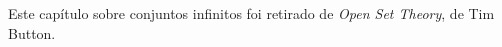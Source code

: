 \documentclass[../../../include/open-logic-chapter]{subfiles}
\begin{document}

\begin{editorial}
Este capítulo sobre conjuntos infinitos foi retirado de \emph{Open Set
Theory}, de Tim Button.
\end{editorial}

\end{document}
